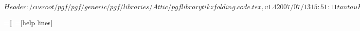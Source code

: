 %
%
%

\ProvidesFileRCS[v\pgfversion] $Header: /cvsroot/pgf/pgf/generic/pgf/libraries/Attic/pgflibrarytikzfolding.code.tex,v 1.4 2007/07/13 15:51:11 tantau Exp $


%
% 

\newdimen\tikz@lib@fold@length
\tikz@lib@fold@length=2cm


\def\tikz@lib@fold@pentagon#1#2#3#4#5#6{%
  \begin{scope}[xshift=.5\tikz@lib@fold@length,yshift=0.68819\tikz@lib@fold@length]
    #1
  \end{scope}
  \begin{scope}[shift={(108:\tikz@lib@fold@length)},shift={(36:\tikz@lib@fold@length)},rotate=-36]
    #2
  \end{scope}
  \begin{scope}[xshift=\tikz@lib@fold@length,shift={(72:\tikz@lib@fold@length)},rotate=-108]
    #3
  \end{scope}
  \begin{scope}[xshift=\tikz@lib@fold@length,rotate=180]
    #4
  \end{scope}
  \begin{scope}[rotate=108]
    #5
  \end{scope}
  \begin{scope}[shift={(108:\tikz@lib@fold@length)},rotate=36]
    #6
  \end{scope}
}


\def\tikz@lib@fold@path{\draw[every fold](0,0) -- (\tikz@lib@fold@length,0pt);}
\def\tikz@lib@fold@cut@path{\draw[every cut](0,0) -- (\tikz@lib@fold@length,0pt);}
\def\tikz@lib@fold@ear@path{
  \draw[every fold](0,0) -- (\tikz@lib@fold@length,0pt);
  \draw[every cut] (0,0) -- (.5\tikz@lib@fold@length,.2\tikz@lib@fold@length) --(\tikz@lib@fold@length,0pt);}

=[]
=[help lines]


